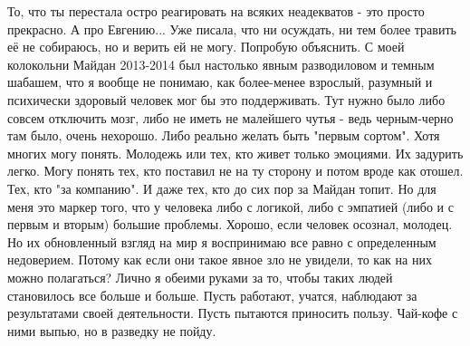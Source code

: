 \begin{itemize}
То, что ты перестала остро реагировать на всяких неадекватов - это просто
прекрасно. А про Евгению... Уже писала, что ни осуждать, ни тем более травить
её не собираюсь, но и верить ей не могу. Попробую объяснить. С моей колокольни
Майдан 2013-2014 был настолько явным разводиловом и темным шабашем, что я
вообще не понимаю, как более-менее взрослый, разумный и психически здоровый
человек мог бы это поддерживать. Тут нужно было либо совсем отключить мозг,
либо не иметь не малейшего чутья - ведь черным-черно там было, очень нехорошо.
Либо реально желать быть "первым сортом". Хотя многих могу понять. Молодежь или
тех, кто живет только эмоциями. Их задурить легко. Могу понять тех, кто
поставил не на ту сторону и потом вроде как отошел. Тех, кто "за компанию". И
даже тех, кто до сих пор за Майдан топит. Но для меня это маркер того, что у
человека либо с логикой, либо с эмпатией (либо и с первым и вторым) большие
проблемы. Хорошо, если человек осознал, молодец. Но их обновленный взгляд на
мир я воспринимаю все равно с определенным недоверием. Потому как если они
такое явное зло не увидели, то как на них можно полагаться? Лично я обеими
руками за то, чтобы таких людей становилось все больше и больше. Пусть
работают, учатся, наблюдают за результатами своей деятельности. Пусть пытаются
приносить пользу. Чай-кофе с ними выпью, но в разведку не пойду.

\end{itemize} %
